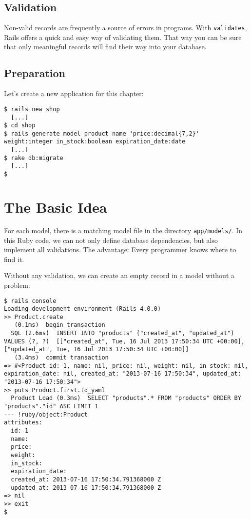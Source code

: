 \documentclass[a4paper]{book}
\newcounter{tab}[chapter]
\begin{document}
\subsection{Validation}\label{validation}

Non-valid records are frequently a source of errors in programs. With \texttt{validates}, Rails offers a quick and easy way of validating them. That way you can be sure that only meaningful records will find their way into your database.

\subsection{Preparation}\label{preparation-3}

Let's create a new application for this chapter:

\begin{shaded}\begin{verbatim}
$ rails new shop
  [...]
$ cd shop
$ rails generate model product name 'price:decimal{7,2}' weight:integer in_stock:boolean expiration_date:date
  [...]
$ rake db:migrate
  [...]
$
\end{verbatim}\end{shaded}

\section{The Basic Idea}\label{the-basic-idea}

For each model, there is a matching model file in the directory \texttt{app/models/}. In this Ruby code, we can not only define database dependencies, but also implement all validations. The advantage: Every programmer knows where to find it.

Without any validation, we can create an empty record in a model without a problem:

\begin{shaded}\begin{verbatim}
$ rails console
Loading development environment (Rails 4.0.0)
>> Product.create
   (0.1ms)  begin transaction
  SQL (2.6ms)  INSERT INTO "products" ("created_at", "updated_at") VALUES (?, ?)  [["created_at", Tue, 16 Jul 2013 17:50:34 UTC +00:00], ["updated_at", Tue, 16 Jul 2013 17:50:34 UTC +00:00]]
   (3.4ms)  commit transaction
=> #<Product id: 1, name: nil, price: nil, weight: nil, in_stock: nil, expiration_date: nil, created_at: "2013-07-16 17:50:34", updated_at: "2013-07-16 17:50:34">
>> puts Product.first.to_yaml
  Product Load (0.3ms)  SELECT "products".* FROM "products" ORDER BY "products"."id" ASC LIMIT 1
--- !ruby/object:Product
attributes:
  id: 1
  name:
  price:
  weight:
  in_stock:
  expiration_date:
  created_at: 2013-07-16 17:50:34.791368000 Z
  updated_at: 2013-07-16 17:50:34.791368000 Z
=> nil
>> exit
$
\end{verbatim}\end{shaded}
\end{document}
